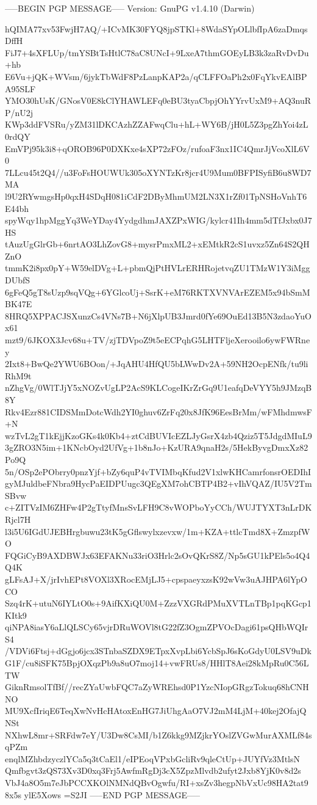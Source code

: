 -----BEGIN PGP MESSAGE-----
Version: GnuPG v1.4.10 (Darwin)

hQIMA77xv53FwjH7AQ/+ICvMK30FYQ8jpSTKl+8WdaSYpOLlbfIpA6zaDmqsDffH
FiJ7+4sXFLUp/tmYSBtTsHtlC78aC8UNcI+9LxeA7thmGOEyLB3k3zaRvDvDu+hb
E6Vu+jQK+WVsm/6jykTbWdF8PzLanpKAP2a/qCLFFOaPh2x0FqYkvEAlBPA95SLF
YMO30hUsK/GNosV0E8kClYHAWLEFq0eBU3tyaCbpjOhYYrvUxM9+AQ3nuRP/nU2j
KWp3ddFVSRu/yZM31lDKCAzhZZAFwqClu+hL+WY6B/jH0L5Z3pgZhYoi4zL0rdQY
EmVPj95k3i8+qOROB96P0DXKxe4sXP72zFOz/rufoaF3nx1IC4QmrJjVcoXlL6V0
7LLcu45t2Q4//u3FoFsHOUWUk305oXYNTzKr8jcr4U9Mum0BFPISyfiB6u8WD7MA
l9U2RYwmgsHp0qxH4SDqH081iCdF2DByMhmUM2LN3X1rZf01TpNSHoVnhT6E44bh
spyWqy1hpMggYq3WeYDay4YydgdhmJAXZPxWIG/kylcr41Ih4mm5dTfJxbx0J7HS
tAuzUgGlrGb+6nrtAO3LhZovG8+mysrPmxML2+xEMtkR2cS1uvxz5Zn64S2QHZnO
tmmK2i8px0pY+W59elDVg+L+pbmQjPtHVLrERHRojetvqZU1TMzW1Y3iMggDUbfS
6gFeQ5gT8sUzp9sqVQg+6YGlcoUj+SsrK+eM76RKTXVNVArEZEM5x94bSmMBK47E
8HRQ5XPPACJSXunzCs4VNs7B+N6jXlpUB3Jmrd0fYe69OuEd13B5N3zdaoYuOx61
mzt9/6JKOX3Jcv68u+TV/zjTDVpoZ9t5eECPqhG5LHTFljeXerooilo6ywFWRney
2Ixt8+BwQe2YWU6BOon/+JqAHU4HfQU5bLWwDv2A+59NH2OcpENfk/tu9liRhM9t
nZhgVg/0WlTJjY5xNOZvUgLP2AcS9KLCogeIKrZrGq9U1eafqDeVYY5h9JMzqB8Y
Rkv4Ezr881CIDSMmDotcWdh2YI0ghuv6ZrFq20x8JfK96EesBrMm/wFMhdmwsF+N
wzTvL2gT1kEjjKzoGKs4k0Kb4+ztCdBUVIcEZLJyGsrX4zb4Qziz5T5JdgdMIuL9
3gZRO3N5im+1KNcbOyd2UfVg+1b8nJo+KzURA9qnaH2s/5HekByvgDmxXz82Po9Q
5n/OSp2ePObrry0pnzYjf+bZy6quP4vTVIMbqKfud2V1xlwKHCamrfonsrOEDIhI
gyMJuldbeFNbra9HycPaEIDPUugc3QEgXM7ohCBTP4B2+vIhVQAZ/IU5V2TmSBvw
c+ZITVzIM6ZHFw4P2gTtyfMnsSvLFH9C8vWOPboYyCCh/WUJTYXT3nLrDKRjcl7H
l3i5U6IGdUJEBHrgbuwu23tK5gGflswylxzevxw/1m+KZA+ttlcTmd8X+ZmzpfWO
FQGiCyB9AXDBWJx63EFAKNu33riO3Hrlc2sOvQKrS8Z/Np5sGU1kPEls5o4Q4Q4K
gLFsAJ+X/jrIvhEPt8VOXl3XRocEMjLJ5+cpspaeyxzsK92wVw3uAJHPA6lYpOCO
Szq4rK+utuN6IYLtO0s+9AifKXiQU0M+ZzzVXGRdPMuXVTLnTBp1pqKGcp1KItk9
qiNPA8iasY6aLlQLSCy65vjrDRuWOVl8tG22fZ3OgmZPVOcDagi61psQHbWQIrS4
/VDVi6Ftsj+dGgjo6jcx3STnbaSZDX9ETpxXvpLbi6YcbSpJ6sKoGdyU0LSV9uDk
G1F/cu8iSFK75BpjOXqzPb9a8uO7moj14+vwFRUs8/HHlT8Aei28kMpRu0C56LTW
GiknRmsolTfBf//recZYaUwbFQC7aZyWREhsd0P1YzcNIopGRgzTokuq68hCNHNO
MU9XcfIriqE6TeqXwNvHcHAtoxEnHG7JiUhgAaO7VJ2mM4LjM+40kej2OfajQNSt
NXhwL8mr+SRFdw7eY/U3Dw8CsMI/b1Z6kkg9MZjkrYOslZVGwMurAXMLf84sqPZm
enqlMZhbdzyczlYCa5q3tCaEl1/eIPEoqVPxbGcliRv9qleCtUp+JUYfVz3MtlsN
Qmfbgvt3zQS73Xv3D0xq3Frj5AwfmRgDj3cX5ZpzMlvdb2ufyt2Jxb8YjK0v8d2s
VbJ4a8O5m7eJbPCCXKOlNMNdQBvOgwfu/RI+xsZv3hegpNbVxUc98HA2tat98x5s
ylE5Xows
=S2JI
-----END PGP MESSAGE-----
